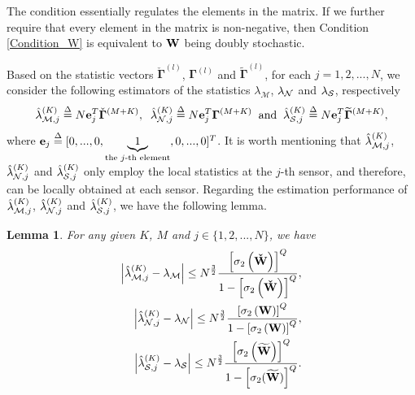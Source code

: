 \documentclass[11pt, draftclsnofoot, onecolumn]{IEEEtran}
\newtheorem{lemma}{Lemma}
\newcommand{\cM}{\mathcal{M}}
\newcommand{\bGamma}{{\boldsymbol{\Gamma}}}
\newcommand{\cbGamma}{{\check{\boldsymbol{\Gamma}}}}
\newcommand{\tbGamma}{{\widetilde{\boldsymbol{\Gamma}}}}
\newcommand{\cu}{{\check{u}}}
\newcommand{\cW}{{\check{W}}}
\newcommand{\tW}{{\widetilde{W}}}
\begin{document}
The condition essentially regulates the elements in the matrix. If we further require that every element in the matrix is non-negative, then Condition \ref{Condition_W} is equivalent to ${\bf W}$ being doubly stochastic.

Based on the statistic vectors ${\cbGamma ^{\left( l \right)}}$, ${\bGamma ^{\left( l \right)}}$ and ${\tbGamma ^{\left( l \right)}}$, for each $j=1,2,...,N$, we consider the following estimators of the statistics ${\lambda _\cM}$, ${\lambda _{\cal N}} $ and ${\lambda _{\cal S}}$, respectively
\begin{equation} \label{hat_lambda_define}
\hat \lambda _{{\cal M},j}^{(K)} \buildrel \Delta \over =  N{\bf{e}}_j^T{\cbGamma ^{\left( {M + K} \right)}}, \;\; \hat \lambda _{{\cal N},j}^{(K)} \buildrel \Delta \over = N{\bf{e}}_j^T{\bGamma ^{\left( {M + K} \right)}} \;\; \text{and} \;\; \hat \lambda _{{\cal S},j}^{(K)} \buildrel \Delta \over = N{\bf{e}}_j^T{\tbGamma ^{\left( {M + K} \right)}},
\end{equation}
where ${{\bf{e}}_j} \buildrel \Delta \over = {[0,...,0,\underbrace 1_{{\text{the }}j\text{-th element}},0,...,0]^T}$. It is worth mentioning that $\hat \lambda _{{\cal M},j}^{(K)}$, $\hat \lambda _{{\cal N},j}^{(K)}$ and $\hat \lambda _{{\cal S},j}^{(K)}$ only employ the local statistics at the $j$-th sensor, and therefore, can be locally obtained at each sensor. Regarding the estimation performance of $\hat \lambda _{{\cal M},j}^{(K)}$, $\hat \lambda _{{\cal N},j}^{(K)}$ and $\hat \lambda _{{\cal S},j}^{(K)}$, we   have   the following lemma.
\begin{lemma} \label{Lemma_lambda_diff_ub}
	For any given $K$, $M$ and $j \in \{1,2,...,N\}$, we have
	\begin{align} \label{lambda_M_diff_ub}
	\left| {\hat \lambda _{{\cal M},j}^{(K)} - {\lambda _{\cM}}} \right| \le {N^{\frac{3}{2}}}\frac{{{{\left[ {{\sigma _2}\left( {\bf{\cW}} \right)} \right]}^Q}}}{{1 - {{\left[ {{\sigma _2}\left( {\bf{\cW}} \right)} \right]}^Q}}}, \\  \label{lambda_N_diff_ub}
	\left| {\hat \lambda _{{\cal N},j}^{(K)} - {\lambda _{\cal N}}} \right| \le {N^{\frac{3}{2}}} \frac{{{{\left[ {{\sigma _2}\left( {\bf{W}} \right)} \right]}^Q}}}{{1 - {{\left[ {{\sigma _2}\left( {\bf{W}} \right)} \right]}^Q}}}, \\  \label{lambda_S_diff_ub}
	\left| {\hat \lambda _{{\cal S},j}^{(K)} - {\lambda _{\cal S}}} \right| \le {N^{\frac{3}{2}}}\frac{{{{\left[ {{\sigma _2}\left( {\bf{\tW}} \right)} \right]}^Q}}}{{1 - {{\left[ {{\sigma _2}( {\bf{\tW}} )} \right]}^Q}}}.
	\end{align}
\end{lemma}
\end{document}
